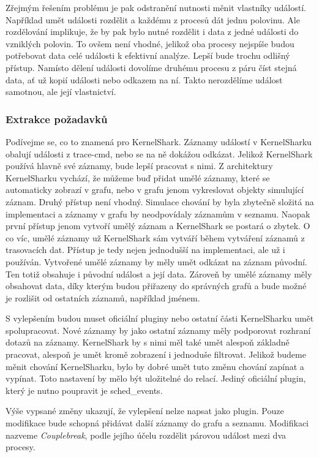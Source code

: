 Zřejmým řešením problému je pak odstranění nutnosti měnit vlastníky událostí. Například umět události rozdělit a každému z procesů dát jednu polovinu. Ale rozdělování implikuje, že by pak bylo nutné rozdělit i data z jedné události do vzniklých polovin. To ovšem není vhodné, jelikož oba procesy nejspíše budou potřebovat data celé události k efektivní analýze. Lepší bude trochu odlišný přístup. Namísto dělení události dovolíme druhému procesu z páru číst stejná data, ať už kopií události nebo odkazem na ní. Takto nerozdělíme událost samotnou, ale její vlastnictví.

\subsubsection*{Extrakce požadavků}
Podívejme se, co to znamená pro KernelShark. Záznamy událostí v KernelSharku obalují události z trace-cmd, nebo se na ně dokážou odkázat. Jelikož KernelShark používá hlavně své záznamy, bude lepší pracovat s nimi. Z architektury KernelSharku vychází, že můžeme buď přidat umělé záznamy, které se automaticky zobrazí v grafu, nebo v grafu jenom vykreslovat objekty simulující záznam. Druhý přístup není vhodný. Simulace chování by byla zbytečně složitá na implementaci a záznamy v grafu by neodpovídaly záznamům v seznamu. Naopak první přístup jenom vytvoří umělý záznam a KernelShark se postará o zbytek. O co víc, umělé záznamy už KernelShark sám vytváří během vytváření záznamů z trasovacích dat. Přístup je tedy nejen jednodušší na implementaci, ale už i používán. Vytvořené umělé záznamy by měly umět odkázat na záznam původní. Ten totiž obsahuje i původní událost a její data. Zároveň by umělé záznamy měly obsahovat data, díky kterým budou přiřazeny do správných grafů a bude možné je rozlišit od ostatních záznamů, například jménem.

S vylepšením budou muset oficiální pluginy nebo ostatní části KernelSharku umět spolupracovat. Nové záznamy by jako ostatní záznamy měly podporovat rozhraní dotazů na záznamy. KernelShark by s nimi měl také umět alespoň základně pracovat, alespoň je umět kromě zobrazení i jednoduše filtrovat. Jelikož budeme měnit chování KernelSharku, bylo by dobré umět tuto změnu chování zapínat a vypínat. Toto nastavení by mělo být uložitelné do relací. Jediný oficiální plugin, který je nutno poupravit je sched\_events.

Výše vypsané změny ukazují, že vylepšení nelze napsat jako plugin. Pouze modifikace bude schopná přidávat další záznamy do grafu a seznamu. Modifikaci nazveme \emph{Couplebreak}, podle jejího účelu rozdělit párovou událost mezi dva procesy.

